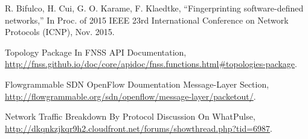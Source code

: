 \documentclass[conference]{IEEEtran}
\begin{document}
\begin{thebibliography}{1}
R. Bifulco, H. Cui, G. O. Karame, F. Klaedtke,
``Fingerprinting software-defined networks,'' In Proc. of 2015 IEEE 23rd International Conference on Network Protocols (ICNP), Nov. 2015.

Topology Package In FNSS API Documentation, \url{http://fnss.github.io/doc/core/apidoc/fnss.functions.html#topologies-package}.

Flowgrammable SDN OpenFlow Doumentation Message-Layer Section, \url{http://flowgrammable.org/sdn/openflow/message-layer/packetout/}.

Network Traffic Breakdown By Protocol Discussion On WhatPulse, \url{http://dkqnkzjkqr9h2.cloudfront.net/forums/showthread.php?tid=6987}.

\end{thebibliography}
\end{document}
